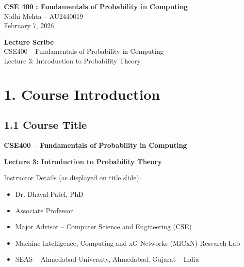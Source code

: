 \documentclass[11pt]{article}
\begin{document}

\begin{center}
{\large \textbf{CSE 400 : Fundamentals of Probability in Computing}}\\
\vspace{0.3cm}
Nidhi Mehta – AU2440019\\
February 7, 2026
\end{center}

\vspace{0.3cm}

\noindent


\vspace{0.3cm}



\vspace{0.8cm}


\begin{center}
{\LARGE \textbf{Lecture Scribe}}\\[0.2cm]
{\large CSE400 – Fundamentals of Probability in Computing}\\
{\large Lecture 3: Introduction to Probability Theory}
\end{center}

\vspace{0.8cm}

\section*{1. Course Introduction}

\subsection*{1.1 Course Title}

\textbf{CSE400 – Fundamentals of Probability in Computing}

\textbf{Lecture 3: Introduction to Probability Theory}

Instructor Details (as displayed on title slide):

\begin{itemize}
    \item Dr. Dhaval Patel, PhD
    \item Associate Professor
    \item Major Advisor – Computer Science and Engineering (CSE)
    \item Machine Intelligence, Computing and xG Networks (MICxN) Research Lab
    \item SEAS – Ahmedabad University, Ahmedabad, Gujarat – India
\end{itemize}
\end{document}
